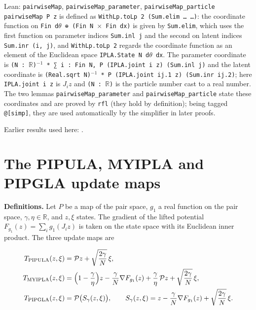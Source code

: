 \documentclass[11pt,a4paper]{article}
\begin{document}
\begin{leanbox}{Lean: \texttt{pairwiseMap}, \texttt{pairwiseMap\_\allowbreak{}parameter}, \texttt{pairwiseMap\_\allowbreak{}particle}}
\texttt{pairwise\allowbreak{}Map P z} is defined as \texttt{With\allowbreak{}Lp.\allowbreak{}to\allowbreak{}Lp 2 (Sum.\allowbreak{}elim … …)}: the coordinate function on \texttt{Fin d\ensuremath{\theta} ⊕ (Fin N \ensuremath{\times} Fin dx)} is given by \texttt{Sum.\allowbreak{}elim}, which uses the first function on parameter indices \texttt{Sum.\allowbreak{}inl j} and the second on latent indices \texttt{Sum.\allowbreak{}inr (i, j)}, and \texttt{With\allowbreak{}Lp.\allowbreak{}to\allowbreak{}Lp 2} regards the coordinate function as an element of the Euclidean space \texttt{IPLA.\allowbreak{}State N d\ensuremath{\theta} dx}. The parameter coordinate is \texttt{(N : \ensuremath{\mathbb R})\ensuremath{{}^{-1}} * ∑ i : Fin N, P (IPLA.\allowbreak{}joint i z) (Sum.\allowbreak{}inl j)} and the latent coordinate is \texttt{(Real.\allowbreak{}sqrt N)\ensuremath{{}^{-1}} * P (IPLA.\allowbreak{}joint ij.\allowbreak{}1 z) (Sum.\allowbreak{}inr ij.\allowbreak{}2)}; here \texttt{IPLA.\allowbreak{}joint i z} is \(J_iz\) and \texttt{(N : \ensuremath{\mathbb R})} is the particle number cast to a real number. The two lemmas \texttt{pairwise\allowbreak{}Map\_\allowbreak{}parameter} and \texttt{pairwise\allowbreak{}Map\_\allowbreak{}particle} state these coordinates and are proved by \texttt{rfl} (they hold by definition); being tagged \texttt{@[simp]}, they are used automatically by the simplifier in later proofs.
\end{leanbox}


Earlier results used here: \cite[Section~3.1.1]{LangevinLean2026IPLA}.

\section{\texorpdfstring{The PIPULA, MYIPLA and PIPGLA update maps}{The PIPULA, MYIPLA and PIPGLA update maps}}


\textbf{Definitions.} Let \(P\) be a map of the pair space, \(g_1\) a real function on the pair space, \(\gamma,\eta\in\mathbb R\), and \(z,\xi\) states. The gradient of the lifted potential \(F_{g_1}(z)=\sum_ig_1(J_iz)\) is taken on the state space with its Euclidean inner product. The three update maps are


\[\begin{aligned}
T_{\mathrm{PIPULA}}(z,\xi)&=\mathcal Pz+\sqrt{\frac{2\gamma}{N}}\,\xi,\\
T_{\mathrm{MYIPLA}}(z,\xi)&=\Bigl(1-\frac\gamma\eta\Bigr)z-\frac\gamma N\nabla F_{g_1}(z)+\frac\gamma\eta\,\mathcal Pz+\sqrt{\frac{2\gamma}{N}}\,\xi,\\
T_{\mathrm{PIPGLA}}(z,\xi)&=\mathcal P\bigl(S_\gamma(z,\xi)\bigr),\qquad S_\gamma(z,\xi)=z-\frac\gamma N\nabla F_{g_1}(z)+\sqrt{\frac{2\gamma}{N}}\,\xi .
\end{aligned}\]
\end{document}
